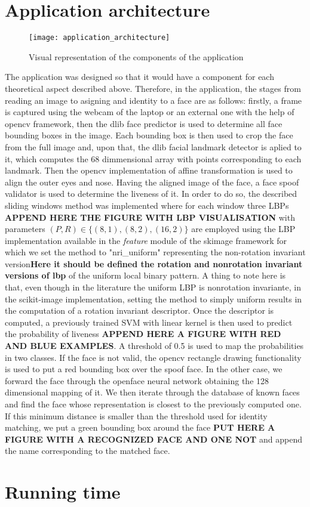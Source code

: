 \section{Application architecture}
\begin{figure}[H]
	\captionsetup{width=15cm,font=small}
	\begin{center}
		\texttt{[image: application\_architecture]}
	\end{center}
	\caption[Application architecure]{Visual representation of the components of the application}
	\label{fig:application_architecture}
\end{figure}
The application was designed so that it would have a component for each theoretical aspect described above. Therefore, in the application, the stages from reading an image to asigning and identity to a face are as follows: firstly, a frame is captured using the webcam of the laptop or an external one with the help of opencv framework, then the dlib \cite{dlib09} face predictor is used to determine all face bounding boxes in the image. 
Each bounding box is then used to crop the face from the full image and, upon that, the dlib facial landmark detector is aplied to it, which computes the 68 dimmensional array with points corresponding to each landmark. 
Then the opencv implementation of affine transformation is used to align the outer eyes and nose. Having the aligned image of the face, a face spoof validator is used to determine the liveness of it. 
In order to do so, the described sliding windows method was implemented where for each window three LBPs \textbf{APPEND HERE THE FIGURE WITH LBP VISUALISATION} with parameters $(P,R) \in \{(8,1), (8,2), (16,2)\}$ are employed using the LBP implementation available in the \textit{feature} module of the skimage \cite{scikit-image} framework for which we set the method to "nri\_uniform" representing the non-rotation invariant version\textbf{Here it should be defined the rotation and nonrotation invariant versions of lbp} of the uniform local binary pattern. A thing to note here is that, even though in the literature the uniform LBP is nonrotation invariante, in the scikit-image \cite{scikit-image} implementation, setting the method to simply uniform results in the computation of a rotation invariant descriptor. 
Once the descriptor is computed, a previously trained SVM with linear kernel is then used to predict the probability of liveness \textbf{APPEND HERE A FIGURE WITH RED AND BLUE EXAMPLES}. A threshold of 0.5 is used to map the probabilities in two classes. If the face is not valid, the opencv rectangle drawing functionality is used to put a red bounding box over the spoof face. In the other case, we forward the face through the openface neural network obtaining the 128 dimensional mapping of it. We then iterate through the database of known faces and find the face whose representation is closest to the previously computed one. If this minimum distance is smaller than the threshold used for identity matching, we put a green bounding box around the face \textbf{PUT HERE A FIGURE WITH A RECOGNIZED FACE AND ONE NOT} and append the name corresponding to the matched face. 
\section{Running time}

